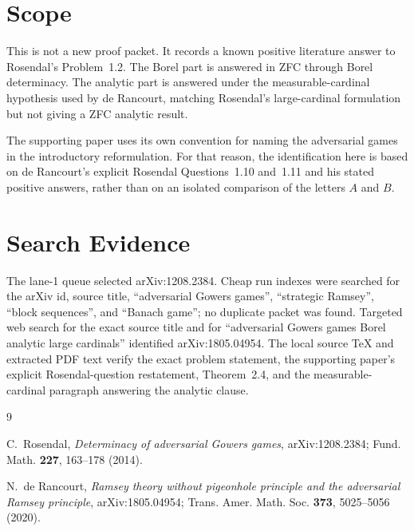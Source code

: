 \documentclass[11pt]{article}
\begin{document}
\section*{Scope}

This is not a new proof packet.  It records a known positive literature answer
to Rosendal's Problem~1.2.  The Borel part is answered in ZFC through Borel
determinacy.  The analytic part is answered under the measurable-cardinal
hypothesis used by de Rancourt, matching Rosendal's large-cardinal formulation
but not giving a ZFC analytic result.

The supporting paper uses its own convention for naming the adversarial games
in the introductory reformulation.  For that reason, the identification here is
based on de Rancourt's explicit Rosendal Questions~1.10 and~1.11 and his stated
positive answers, rather than on an isolated comparison of the letters \(A\)
and \(B\).

\section*{Search Evidence}

The lane-1 queue selected arXiv:1208.2384.  Cheap run indexes were searched for
the arXiv id, source title, ``adversarial Gowers games'', ``strategic Ramsey'',
``block sequences'', and ``Banach game''; no duplicate packet was found.
Targeted web search for the exact source title and for ``adversarial Gowers
games Borel analytic large cardinals'' identified arXiv:1805.04954.  The local
source TeX and extracted PDF text verify the exact problem statement, the
supporting paper's explicit Rosendal-question restatement, Theorem~2.4, and the
measurable-cardinal paragraph answering the analytic clause.

{\raggedright
\begin{thebibliography}{9}

C.~Rosendal,
\emph{Determinacy of adversarial Gowers games},
arXiv:1208.2384; Fund. Math. \textbf{227}, 163--178 (2014).

N.~de Rancourt,
\emph{Ramsey theory without pigeonhole principle and the adversarial Ramsey
principle},
arXiv:1805.04954; Trans. Amer. Math. Soc. \textbf{373}, 5025--5056 (2020).

\end{thebibliography}
}
\end{document}
